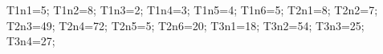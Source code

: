 \documentclass[exercice]{thedocument}%
\begin{document}
%
    \>T1n1=5;%
    \>T1n2=8;%
    \>T1n3=2;%
    \>T1n4=3;%
    \>T1n5=4;%
    \>T1n6=5;%
    \>T2n1=8;%
    \>T2n2=7;%
    \>T2n3=49;%
    \>T2n4=72;%
    \>T2n5=5;%
    \>T2n6=20;%
    \>T3n1=18;%
    \>T3n2=54;%
    \>T3n3=25;%
    \>T3n4=27;%
\end{document}
